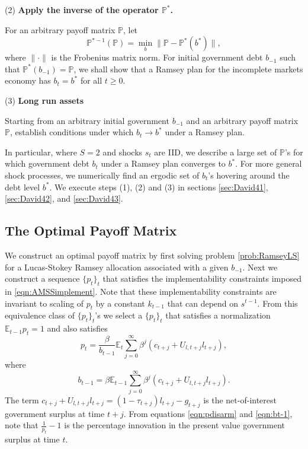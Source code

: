 \documentclass[12pt]{article}
\newcommand{\EE}{\mathbb E}
\begin{document}
\noindent (2) \textbf{Apply the inverse of the operator $\mathbb{P}^*$.}

For an arbitrary payoff matrix $\mathbb{P}$,  let
\begin{equation}\label{eqn:invPoperator}\mathbb{P}^{* -1}(\mathbb{P}) =\min_{b}\|\mathbb{P}-\mathbb{P}^*(b^*)\|,
\end{equation}where $\|\cdot\|$ is the Frobenius matrix norm.  For initial government debt $b_{-1}$ such that $\mathbb P^*(b_{-1}) = \mathbb P$, we shall show that a Ramsey plan for the incomplete markets economy has $b_t = b^*$ for all $t \geq 0$.


\noindent (3) \textbf{Long run assets}

Starting from an arbitrary initial government $b_{-1}$ and an arbitrary payoff matrix $\mathbb{P}$,  establish conditions under  which $b_t \to b^*$ under a Ramsey plan.


In particular, where $S=2$ and shocks $s_t$ are IID,  we describe a large set of  $\mathbb{P}$'s for which government debt $b_t$  under a Ramsey plan converges to $b^*$.  For more general shock processes, we numerically find  an ergodic set of $b_t$'s hovering around the debt level $b^*$.  We execute steps (1), (2) and (3) in sections \ref{sec:David41}, \ref{sec:David42}, and \ref{sec:David43}. %

\subsection{The Optimal Payoff Matrix\label{sec:David41}} We construct an  optimal payoff matrix by first solving  problem \ref{prob:RamseyLS} for a Lucas-Stokey Ramsey allocation associated with a given $b_{-1}$. Next we construct a sequence $\{p_t\}_t$ that satisfies the implementability constraints imposed in \eqref{eqn:AMSSimplement}.  Note that these implementability constraints are invariant to scaling of $p_t$ by a constant $k_{t-1} $ that can depend on $s^{t-1}$. From this equivalence class of $\{p_t\}_t$'s we select a  $\{p_t\}_t$ that satisfies a normalization  %
$\mathbb{E}_{t-1}p_t=1$ and also satisfies
\begin{equation}\label{eqn:pdisarm}
p_t =  \frac{\beta}{b_{t-1}}\EE_t\sum_{j=0}^\infty\beta^j\left( c_{t+j}+U_{l,t+j}l_{t+j}\right),
\end{equation} where
\begin{equation}\label{eqn:bt-1}
	b_{t-1} = \beta \EE_{t-1}\sum_{j=0}^\infty \beta^j(c_{t+j}+U_{l,t+j}l_{t+j}).
\end{equation}  The term $c_{t+j} +U_{l,t+j}l_{t+j}=(1-\tau_{t+j})l_{t+j} - g_{t+j}$  is the net-of-interest government surplus at time $t+j$.  From equations \eqref{eqn:pdisarm} and \eqref{eqn:bt-1}, note that  $\frac{1}{p_t}-1$ is  the percentage innovation in the present value government surplus at time $t$.
\end{document}

